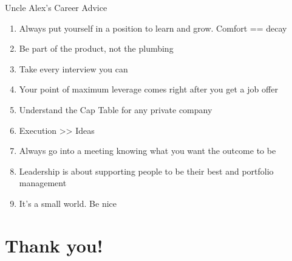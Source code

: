 \documentclass[nobackground,dvipsnames,table,aspectratio=169]{beamer}
\begin{document}
\begin{frame}{Uncle Alex's Career Advice}
    \begin{enumerate}
        \item Always put yourself in a position to learn and grow. Comfort == decay
        \item Be part of the product, not the plumbing
        \item Take every interview you can
        \item Your point of maximum leverage comes right after you get a job offer
        \item Understand the Cap Table for any private company
        \item Execution >> Ideas
        \item Always go into a meeting knowing what you want the outcome to be
        \item Leadership is about supporting people to be their best and portfolio management
        \item It’s a small world. Be nice
    \end{enumerate}
\end{frame}

\section{Thank you!}

\begin{frame}{}%
    \thispagestyle{empty}
\end{frame}
\end{document}
